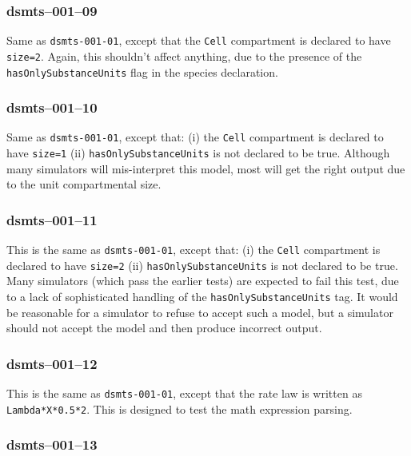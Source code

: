 
\subsubsection{dsmts--001--09} 

Same as \verb$dsmts-001-01$, except that the \verb$Cell$ compartment
is declared to have \verb$size=2$. Again, this shouldn't affect
anything, due to the presence of the \verb$hasOnlySubstanceUnits$ flag
in the species declaration.


\subsubsection{dsmts--001--10}

Same as \verb$dsmts-001-01$, except that: (i) the \verb$Cell$
compartment is declared to have \verb$size=1$ (ii)
\verb$hasOnlySubstanceUnits$ is not declared to be true. Although many
simulators will mis-interpret this model, most will get the right
output due to the unit compartmental size. 


\subsubsection{dsmts--001--11}

This is the same as \verb$dsmts-001-01$, except that: (i) the
\verb$Cell$ compartment is declared to have \verb$size=2$ (ii)
\verb$hasOnlySubstanceUnits$ is not declared to be true. Many
simulators (which pass the earlier tests) are expected to fail this
test, due to a lack of sophisticated handling of the
\verb$hasOnlySubstanceUnits$ tag. It would be reasonable for a
simulator to refuse to accept such a model, but a simulator should not
accept the model and then produce incorrect
output.


\subsubsection{dsmts--001--12}

This is the same as \verb$dsmts-001-01$, except that the rate law is
written as \verb$Lambda*X*0.5*2$. This is designed to test the math
expression parsing.


\subsubsection{dsmts--001--13}


